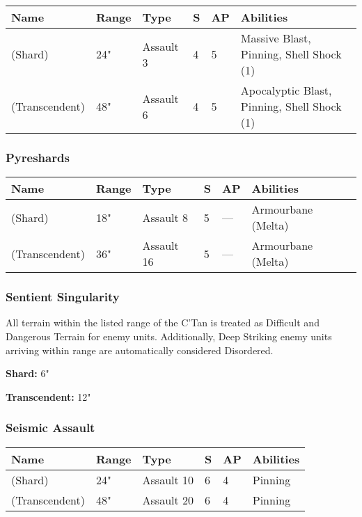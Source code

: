 \noindent
\begin{tabular}{||m{160pt} m{31pt} m{55pt} m{12pt} m{12pt} m{200pt}||}
	\hline
	Name & Range & Type & S & AP & Abilities \\
	\hline
	\quickref{Moulder of Worlds} (Shard) & 24" & Assault 3 & 4 & 5 & Massive Blast, Pinning, Shell Shock (1) \\
	\quickref{Moulder of Worlds} (Transcendent) & 48" & Assault 6 & 4 & 5 & Apocalyptic Blast, Pinning, Shell Shock (1) \\
	\hline
\end{tabular}

\subsubsection{Pyreshards} \label{Pyreshards}

\noindent
\begin{tabular}{||m{160pt} m{31pt} m{55pt} m{12pt} m{12pt} m{200pt}||}
	\hline
	Name & Range & Type & S & AP & Abilities \\
	\hline
	\quickref{Pyreshards} (Shard) & 18" & Assault 8 & 5 & — & Armourbane (Melta) \\
	\quickref{Pyreshards} (Transcendent) & 36" & Assault 16 & 5 & — & Armourbane (Melta) \\
	\hline
\end{tabular}

\subsubsection{Sentient Singularity} \label{Sentient Singularity}

All terrain within the listed range of the C'Tan is treated as Difficult and Dangerous Terrain for enemy units. Additionally, Deep Striking enemy units arriving within range are automatically considered Disordered.

\textbf{Shard:} 6"

\textbf{Transcendent:} 12"

\subsubsection{Seismic Assault} \label{Seismic Assault}

\noindent
\begin{tabular}{||m{160pt} m{31pt} m{55pt} m{12pt} m{12pt} m{200pt}||}
	\hline
	Name & Range & Type & S & AP & Abilities \\
	\hline
	\quickref{Seismic Assault} (Shard) & 24" & Assault 10 & 6 & 4 & Pinning \\
	\quickref{Seismic Assault} (Transcendent) & 48" & Assault 20 & 6 & 4 & Pinning \\
	\hline
\end{tabular}


